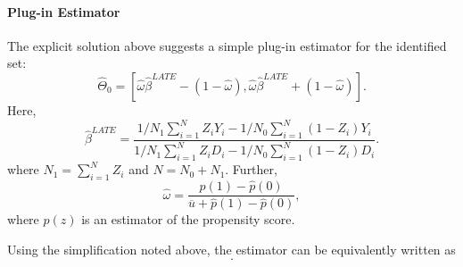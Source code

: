 \documentclass[11pt,a4paper,english]{article} %
\numberwithin{equation}{section}
\numberwithin{figure}{section}
\numberwithin{table}{section}
\theoremstyle{definition}
\theoremstyle{remark}
\begin{document}
\paragraph{Plug-in Estimator}
The explicit solution above suggests a simple plug-in estimator for the identified set:
\begin{equation}
	\hat{\Theta}_0 = \left[\hat{\omega} \hat{\beta}^{LATE} - (1-\hat{\omega}), \hat{\omega}\hat{\beta}^{LATE} + (1-\hat{\omega}) \right].
\end{equation}
Here,
\begin{equation}
	\hat{\beta}^{LATE}  = \frac{1/N_1 \sum_{i=1}^N Z_iY_i - 1/N_0 \sum_{i=1}^N(1-Z_i)Y_i}{1/N_1\sum_{i=1}^NZ_iD_i - 1/N_0\sum_{i=1}^N (1-Z_i)D_i}.
\end{equation}
where $N_1 = \sum_{i=1}^N Z_i$ and $N = N_0 + N_1$. Further,
\begin{equation}
	\hat{\omega} = \frac{\hat{p}(1) - \hat{p}(0)}{\overline{u} + \hat{p}(1) - \hat{p}(0)},
\end{equation}
where $\hat{p}(z)$ is an estimator of the propensity score.

Using the simplification noted above, the estimator can be equivalently written as
\begin{equation}
	.
\end{equation}




\end{document}
